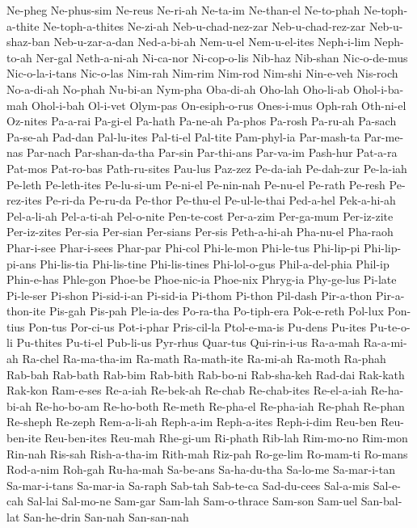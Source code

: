 {  Ne-pheg Ne-phus-sim Ne-reus Ne-ri-ah Ne-ta-im Ne-than-el
  Ne-to-phah Ne-toph-a-thite Ne-toph-a-thites Ne-zi-ah Neb-u-chad-nez-zar Neb-u-chad-rez-zar
  Neb-u-shaz-ban Neb-u-zar-a-dan Ned-a-bi-ah Nem-u-el Nem-u-el-ites Neph-i-lim
  Neph-to-ah Ner-gal Neth-a-ni-ah Ni-ca-nor Ni-cop-o-lis Nib-haz
  Nib-shan Nic-o-de-mus Nic-o-la-i-tans Nic-o-las Nim-rah Nim-rim
  Nim-rod Nim-shi Nin-e-veh Nis-roch No-a-di-ah No-phah
  Nu-bi-an Nym-pha Oba-di-ah Oho-lah Oho-li-ab Ohol-i-ba-mah
  Ohol-i-bah Ol-i-vet Olym-pas On-esiph-o-rus Ones-i-mus Oph-rah
  Oth-ni-el Oz-nites Pa-a-rai Pa-gi-el Pa-hath Pa-ne-ah
  Pa-phos Pa-rosh Pa-ru-ah Pa-sach Pa-se-ah Pad-dan
  Pal-lu-ites Pal-ti-el Pal-tite Pam-phyl-ia Par-mash-ta Par-me-nas
  Par-nach Par-shan-da-tha Par-sin Par-thi-ans Par-va-im Pash-hur
  Pat-a-ra Pat-mos Pat-ro-bas Path-ru-sites Pau-lus Paz-zez
  Pe-da-iah Pe-dah-zur Pe-la-iah Pe-leth Pe-leth-ites Pe-lu-si-um
  Pe-ni-el Pe-nin-nah Pe-nu-el Pe-rath Pe-resh Pe-rez-ites
  Pe-ri-da Pe-ru-da Pe-thor Pe-thu-el Pe-ul-le-thai Ped-a-hel
  Pek-a-hi-ah Pel-a-li-ah Pel-a-ti-ah Pel-o-nite Pen-te-cost Per-a-zim
  Per-ga-mum Per-iz-zite Per-iz-zites Per-sia Per-sian Per-sians
  Per-sis Peth-a-hi-ah Pha-nu-el Pha-raoh Phar-i-see Phar-i-sees
  Phar-par Phi-col Phi-le-mon Phi-le-tus Phi-lip-pi Phi-lip-pi-ans
  Phi-lis-tia Phi-lis-tine Phi-lis-tines Phi-lol-o-gus Phil-a-del-phia Phil-ip
  Phin-e-has Phle-gon Phoe-be Phoe-nic-ia Phoe-nix Phryg-ia
  Phy-ge-lus Pi-late Pi-le-ser Pi-shon Pi-sid-i-an Pi-sid-ia
  Pi-thom Pi-thon Pil-dash Pir-a-thon Pir-a-thon-ite Pis-gah
  Pis-pah Ple-ia-des Po-ra-tha Po-tiph-era Pok-e-reth Pol-lux
  Pon-tius Pon-tus Por-ci-us Pot-i-phar Pris-cil-la Ptol-e-ma-is
  Pu-dens Pu-ites Pu-te-o-li Pu-thites Pu-ti-el Pub-li-us
  Pyr-rhus Quar-tus Qui-rin-i-us Ra-a-mah Ra-a-mi-ah Ra-chel
  Ra-ma-tha-im Ra-math Ra-math-ite Ra-mi-ah Ra-moth Ra-phah
  Rab-bah Rab-bath Rab-bim Rab-bith Rab-bo-ni Rab-sha-keh
  Rad-dai Rak-kath Rak-kon Ram-e-ses Re-a-iah Re-bek-ah
  Re-chab Re-chab-ites Re-el-a-iah Re-ha-bi-ah Re-ho-bo-am Re-ho-both
  Re-meth Re-pha-el Re-pha-iah Re-phah Re-phan Re-sheph
  Re-zeph Rem-a-li-ah Reph-a-im Reph-a-ites Reph-i-dim Reu-ben
  Reu-ben-ite Reu-ben-ites Reu-mah Rhe-gi-um Ri-phath Rib-lah
  Rim-mo-no Rim-mon Rin-nah Ris-sah Rish-a-tha-im Rith-mah
  Riz-pah Ro-ge-lim Ro-mam-ti Ro-mans Rod-a-nim Roh-gah
  Ru-ha-mah Sa-be-ans Sa-ha-du-tha Sa-lo-me Sa-mar-i-tan Sa-mar-i-tans
  Sa-mar-ia Sa-raph Sab-tah Sab-te-ca Sad-du-cees Sal-a-mis
  Sal-e-cah Sal-lai Sal-mo-ne Sam-gar Sam-lah Sam-o-thrace
  Sam-son Sam-uel San-bal-lat San-he-drin San-nah San-san-nah
}
